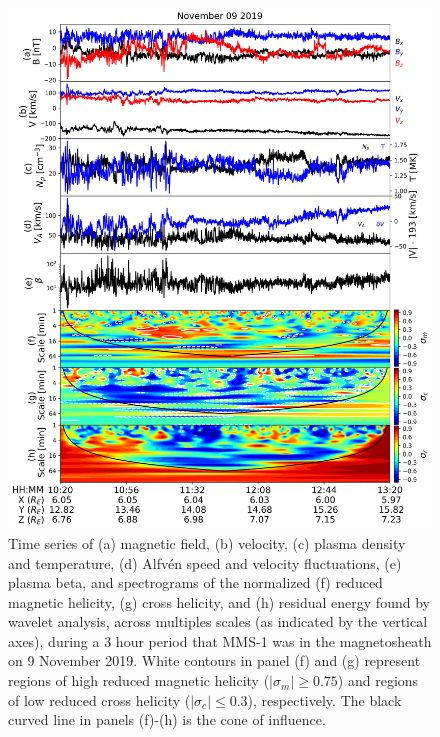 \begin{figure}
    \centering
    \includegraphics[width=\textwidth]{Figures/Time series/spectrograms_09112019_1020_MMS1.png}
    \caption[Time series data and spectrograms of MHD quantities for 9 November 2019]{Time series of (a) magnetic field, (b) velocity, (c) plasma density and temperature, (d) Alfv\'en speed and velocity fluctuations, (e) plasma beta, and spectrograms of the normalized (f) reduced magnetic helicity, (g) cross helicity, and (h) residual energy found by wavelet analysis, across multiples scales (as indicated by the vertical axes), during a 3 hour period that MMS-1 was in the magnetosheath on 9 November 2019. White contours in panel (f) and (g) represent regions of high reduced magnetic helicity ($|\sigma_m| \geq 0.75$) and regions of low reduced cross helicity ($|\sigma_c| \leq 0.3$), respectively. The black curved line in panels (f)-(h) is the cone of influence.}
    \label{fig:wavelet-spectrograms-mms}
\end{figure}

